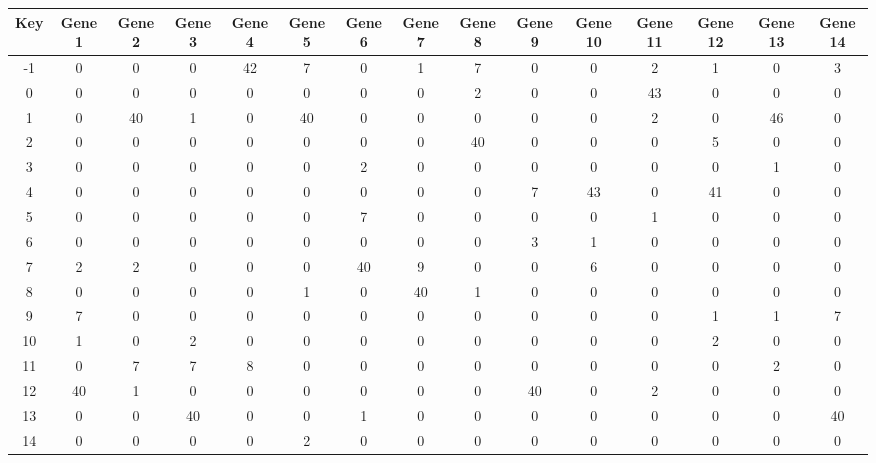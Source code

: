 \begin{tabular}{|c|c|c|c|c|c|c|c|c|c|c|c|c|c|c|}
\hline
Key & Gene 1 & Gene 2 & Gene 3 & Gene 4 & Gene 5 & Gene 6 & Gene 7 & Gene 8 & Gene 9 & Gene 10 & Gene 11 & Gene 12 & Gene 13 & Gene 14 \\
\hline
-1 & 0 & 0 & 0 & 42 & 7 & 0 & 1 & 7 & 0 & 0 & 2 & 1 & 0 & 3 \\
0 & 0 & 0 & 0 & 0 & 0 & 0 & 0 & 2 & 0 & 0 & 43 & 0 & 0 & 0 \\
1 & 0 & 40 & 1 & 0 & 40 & 0 & 0 & 0 & 0 & 0 & 2 & 0 & 46 & 0 \\
2 & 0 & 0 & 0 & 0 & 0 & 0 & 0 & 40 & 0 & 0 & 0 & 5 & 0 & 0 \\
3 & 0 & 0 & 0 & 0 & 0 & 2 & 0 & 0 & 0 & 0 & 0 & 0 & 1 & 0 \\
4 & 0 & 0 & 0 & 0 & 0 & 0 & 0 & 0 & 7 & 43 & 0 & 41 & 0 & 0 \\
5 & 0 & 0 & 0 & 0 & 0 & 7 & 0 & 0 & 0 & 0 & 1 & 0 & 0 & 0 \\
6 & 0 & 0 & 0 & 0 & 0 & 0 & 0 & 0 & 3 & 1 & 0 & 0 & 0 & 0 \\
7 & 2 & 2 & 0 & 0 & 0 & 40 & 9 & 0 & 0 & 6 & 0 & 0 & 0 & 0 \\
8 & 0 & 0 & 0 & 0 & 1 & 0 & 40 & 1 & 0 & 0 & 0 & 0 & 0 & 0 \\
9 & 7 & 0 & 0 & 0 & 0 & 0 & 0 & 0 & 0 & 0 & 0 & 1 & 1 & 7 \\
10 & 1 & 0 & 2 & 0 & 0 & 0 & 0 & 0 & 0 & 0 & 0 & 2 & 0 & 0 \\
11 & 0 & 7 & 7 & 8 & 0 & 0 & 0 & 0 & 0 & 0 & 0 & 0 & 2 & 0 \\
12 & 40 & 1 & 0 & 0 & 0 & 0 & 0 & 0 & 40 & 0 & 2 & 0 & 0 & 0 \\
13 & 0 & 0 & 40 & 0 & 0 & 1 & 0 & 0 & 0 & 0 & 0 & 0 & 0 & 40 \\
14 & 0 & 0 & 0 & 0 & 2 & 0 & 0 & 0 & 0 & 0 & 0 & 0 & 0 & 0 \\
\hline
\end{tabular}